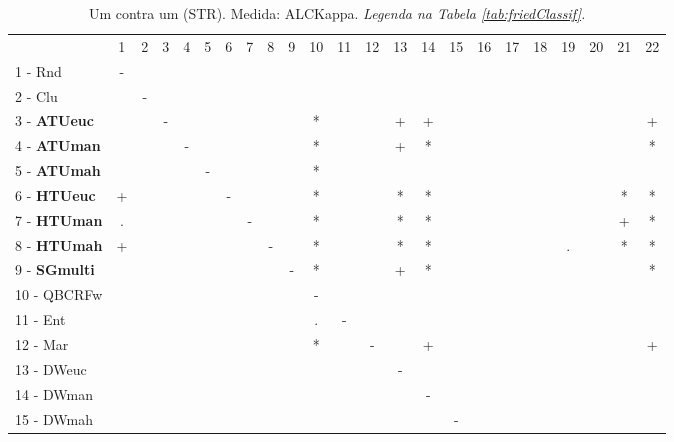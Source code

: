 \begin{table}[h]
\caption{Um contra um (STR). Medida: ALCKappa. \textit{Legenda na Tabela \ref{tab:friedClassif}.}}
\begin{center}\begin{tabular}{lcc|cc|cc|cc|cc|cc|cc|cc|cc|cc|cc}
 			& 1 & 2 & 3 & 4 & 5 & 6 & 7 & 8 & 9 & 10 & 11 & 12 & 13 & 14 & 15 & 16 & 17 & 18 & 19 & 20 & 21 & 22\\
1 - Rnd  	& - &   &   &   &   &   &   &   &   &   &   &   &   &   &   &   &   &   &   &   &   &   \\
2 - Clu  	&   & - &   &   &   &   &   &   &   &   &   &   &   &   &   &   &   &   &   &   &   &   \\ \hline
3 - \textbf{ATUeuc}	&   &   & - &   &   &   &   &   &   & * &   &   & + & + &   &   &   &   &   &   &   & + \\
4 - \textbf{ATUman}	&   &   &   & - &   &   &   &   &   & * &   &   & + & * &   &   &   &   &   &   &   & * \\ \hline
5 - \textbf{ATUmah}	&   &   &   &   & - &   &   &   &   & * &   &   &   &   &   &   &   &   &   &   &   &   \\
6 - \textbf{HTUeuc}	& + &   &   &   &   & - &   &   &   & * &   &   & * & * &   &   &   &   &   &   & * & * \\ \hline
7 - \textbf{HTUman}	& . &   &   &   &   &   & - &   &   & * &   &   & * & * &   &   &   &   &   &   & + & * \\
8 - \textbf{HTUmah}	& + &   &   &   &   &   &   & - &   & * &   &   & * & * &   &   &   &   & . &   & * & * \\ \hline
9 - \textbf{SGmulti}	&   &   &   &   &   &   &   &   & - & * &   &   & + & * &   &   &   &   &   &   &   & * \\
10 - QBCRFw	&   &   &   &   &   &   &   &   &   & - &   &   &   &   &   &   &   &   &   &   &   &   \\ \hline
11 - Ent  	&   &   &   &   &   &   &   &   &   & . & - &   &   &   &   &   &   &   &   &   &   &   \\
12 - Mar  	&   &   &   &   &   &   &   &   &   & * &   & - &   & + &   &   &   &   &   &   &   & + \\ \hline
13 - DWeuc	&   &   &   &   &   &   &   &   &   &   &   &   & - &   &   &   &   &   &   &   &   &   \\
14 - DWman	&   &   &   &   &   &   &   &   &   &   &   &   &   & - &   &   &   &   &   &   &   &   \\ \hline
15 - DWmah	&   &   &   &   &   &   &   &   &   &   &   &   &   &   & - &   &   &   &   &   &   &   \\

\end{tabular}
\end{center}
\end{table}

